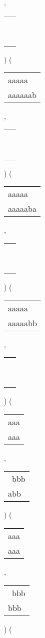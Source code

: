 \begin{description}
 , 
\begin{tabular}{|l|} \hline
\ \\ \ \\ \hline
\end{tabular} 
) 
 ( 
\begin{tabular}{|l|} \hline
aaaaa\ \  \\
aaaaaab \\
\hline
\end{tabular} 
 , 
\begin{tabular}{|l|} \hline
\ \\ \ \\ \hline
\end{tabular} 
) 
 ( 
\begin{tabular}{|l|} \hline
aaaaa\ \  \\
aaaaaba \\
\hline
\end{tabular} 
 , 
\begin{tabular}{|l|} \hline
\ \\ \ \\ \hline
\end{tabular} 
) 
 ( 
\begin{tabular}{|l|} \hline
aaaaa\ \  \\
aaaaabb \\
\hline
\end{tabular} 
 , 
\begin{tabular}{|l|} \hline
\ \\ \ \\ \hline
\end{tabular} 
) 
 ( 
\begin{tabular}{|l|} \hline
aaa \\
aaa \\
\hline
\end{tabular} 
 , 
\begin{tabular}{|l|} \hline
\ bbb \\
abb\  \\
\hline
\end{tabular} 
) 
 ( 
\begin{tabular}{|l|} \hline
aaa \\
aaa \\
\hline
\end{tabular} 
 , 
\begin{tabular}{|l|} \hline
\ bbb \\
bbb\  \\
\hline
\end{tabular} 
) 
 ( 
\begin{tabular}{|l|} \hline

\end{tabular}
\end{description}
